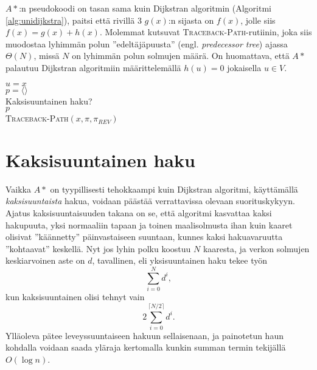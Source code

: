 \documentclass[finnish]{tktltiki2}
\newenvironment{finalgo}[1][htb]{
  \renewcommand{\algorithmcfname}{Algoritmi}
  \begin{algorithm}[#1]
}{\end{algorithm}}
\let\oldnl\nl%
\newcommand{\nonl}{\renewcommand{\nl}{\let\nl\oldnl}}
\theoremstyle{definition}
\theoremstyle{remark}
\begin{document}
\noindent $A\ast$:n pseudokoodi on tasan sama kuin Dijkstran algoritmin (Algoritmi \ref{alg:unidijkstra}), paitsi että rivillä 3 $g(x)$:n sijasta on $f(x)$, jolle siis $f(x) = g(x) + h(x)$. Molemmat kutsuvat \textsc{Traceback-Path}-rutiinin, joka siis muodostaa lyhimmän polun ''edeltäjäpuusta'' (engl. \textit{predecessor tree}) ajassa $\Theta(N)$, missä $N$ on lyhimmän polun solmujen määrä. On huomattava, että $A\ast$ palautuu Dijkstran algoritmiin määrittelemällä $h(u) = 0$ jokaisella $u \in V$.
\begin{finalgo}
$u = x$ \\
$p = \langle  \rangle$ \\
\nonl Kaksisuuntainen haku? \\
\KwRet $p$ \\
\caption{\textsc{Traceback-Path}$(x, \pi, \pi_{REV})$}
\label{alg:tracebackpath}
\end{finalgo}

\section{Kaksisuuntainen haku}
Vaikka $A\ast$ on tyypillisesti tehokkaampi kuin Dijkstran algoritmi, käyttämällä \textit{kaksisuuntaista} hakua, voidaan päästää verrattavissa olevaan suorituskykyyn. Ajatus kaksisuuntaisuuden takana on se, että algoritmi kasvattaa kaksi hakupuuta, yksi normaaliin tapaan ja toinen maalisolmusta ihan kuin kaaret olisivat ''käännetty'' päinvastaiseen suuntaan, kunnes kaksi hakuavaruutta ''kohtaavat'' keskellä. Nyt jos lyhin polku koostuu $N$ kaaresta, ja verkon solmujen keskiarvoinen aste on $d$, tavallinen, eli yksisuuntainen haku tekee työn
\[
\sum_{i = 0}^N d^i,
\]
kun kaksisuuntainen olisi tehnyt vain
\[
2 \sum_{i = 0}^{\lceil N / 2 \rceil} d^i.
\]
Ylläoleva pätee leveyssuuntaiseen hakuun sellaisenaan, ja painotetun haun kohdalla voidaan saada yläraja kertomalla kunkin summan termin tekijällä $O(\log n)$. 
\end{document}
